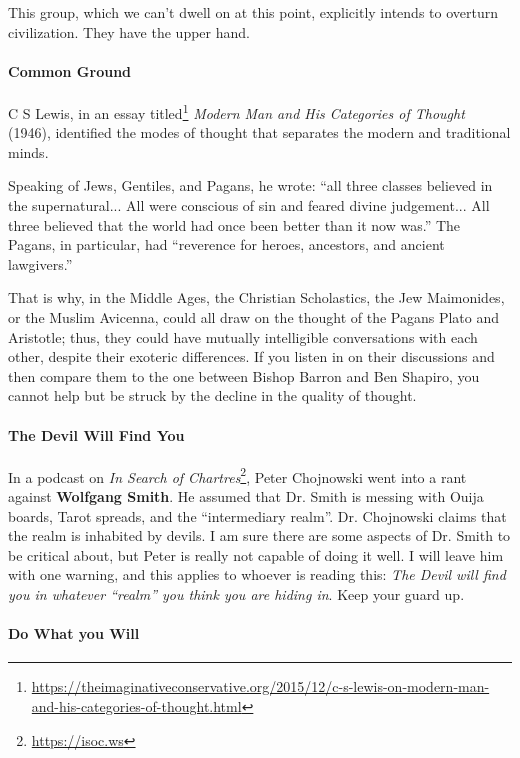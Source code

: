 This group, which we can't dwell on at this point, explicitly intends to overturn civilization. They have the upper hand.

\paragraph{Common Ground}


C S Lewis, in an essay titled\footnote{\url{https://theimaginativeconservative.org/2015/12/c-s-lewis-on-modern-man-and-his-categories-of-thought.html}} \textit{Modern Man and His Categories of Thought} (1946), identified the modes of thought that separates the modern and traditional minds.

Speaking of Jews, Gentiles, and Pagans, he wrote: ``all three classes believed in the supernatural... All were conscious of sin and feared divine judgement... All three believed that the world had once been better than it now was.'' The Pagans, in particular, had ``reverence for heroes, ancestors, and ancient lawgivers.''

That is why, in the Middle Ages, the Christian Scholastics, the Jew Maimonides, or the Muslim Avicenna, could all draw on the thought of the Pagans Plato and Aristotle; thus, they could have mutually intelligible conversations with each other, despite their exoteric differences. If you listen in on their discussions and then compare them to the one between Bishop Barron and Ben Shapiro, you cannot help but be struck by the decline in the quality of thought.

\paragraph{The Devil Will Find You}


In a podcast on \textit{In Search of Chartres}\footnote{\url{https://isoc.ws}}, Peter Chojnowski went into a rant against \textbf{Wolfgang Smith}. He assumed that Dr. Smith is messing with Ouija boards, Tarot spreads, and the ``intermediary realm''. Dr. Chojnowski claims that the realm is inhabited by devils. I am sure there are some aspects of Dr. Smith to be critical about, but Peter is really not capable of doing it well. I will leave him with one warning, and this applies to whoever is reading this: \emph{The Devil will find you in whatever ``realm'' you think you are hiding in}. Keep your guard up.

\paragraph{Do What you Will}


